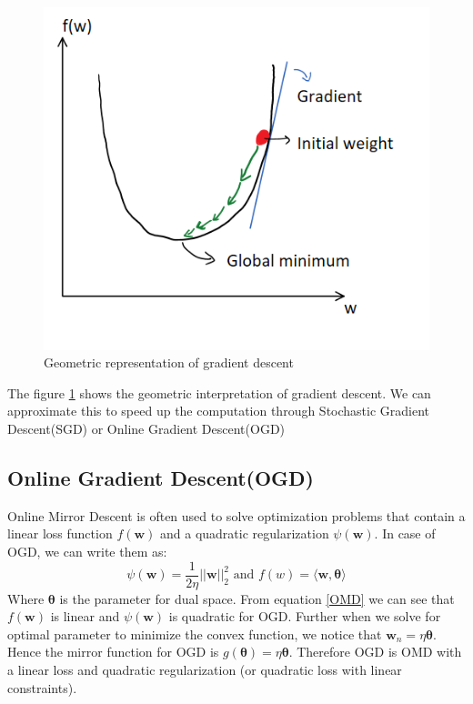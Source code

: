 \documentclass[11pt]{article}
\begin{document}
 \begin{figure}[h!]
    \centering
  \includegraphics[scale=0.7]{fig7.PNG}
  \caption{Geometric representation of gradient descent}
  \label{fig:gd}
\end{figure}
The figure \ref{fig:gd} shows the geometric interpretation of gradient descent. We can approximate this to speed up the computation through Stochastic Gradient Descent(SGD) or Online Gradient Descent(OGD)
\subsection{Online Gradient Descent(OGD)}
Online Mirror Descent is often used to solve optimization problems that contain a linear loss function $f(\mathbf{w})$ and a quadratic regularization $\psi(\mathbf{w})$. In case of OGD, we can write them as:\begin{equation}\label{OMD}
\psi(\mathbf{w}) = \frac{1}{2\eta}||\mathbf{w}||_{2}^{2} \text{  and } f(w) = \langle \mathbf{w},\mathbf{\theta} \rangle
 \end{equation}
\[\]
Where $\mathbf\theta$ is the parameter for dual space. From equation \ref{OMD} we can see that $f(\mathbf{w})$ is linear and $\psi(\mathbf{w})$ is quadratic for OGD. Further when we solve for optimal parameter to minimize the convex function, we notice that $\mathbf{w}_{n} = \eta\mathbf{\theta}$.
Hence the mirror function for OGD is $g(\mathbf{\theta}) = \eta\mathbf{\theta}$. Therefore OGD is OMD with a linear loss and quadratic regularization (or quadratic loss with linear constraints).
\end{document}
